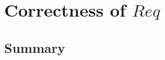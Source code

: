 \chapter[$Req$]{Correctness of $Req$}\label{ch18}

\newpage
\section{Summary}\label{ch18.summary}

\ldefsummary %
\lthmsummary %
\lthmaddeddefsummary %
\lthmaddedthmsummary %
\lzevessummary %
